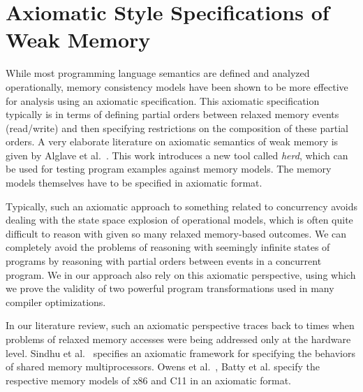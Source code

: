\section{Axiomatic Style Specifications of Weak Memory}

While most programming language semantics are defined and analyzed operationally, memory consistency models have been shown to be more effective for analysis using an axiomatic specification.
This axiomatic specification typically is in terms of defining partial orders between relaxed memory events (read/write) and then specifying restrictions on the composition of these partial orders. 
A very elaborate literature on axiomatic semantics of weak memory is given by Alglave et al.~\cite{Alglave}. 
This work introduces a new tool called \textit{herd}, which can be used for testing program examples against memory models. The memory models themselves have to be specified in axiomatic format. 

Typically, such an axiomatic approach to something related to concurrency avoids dealing with the state space explosion of operational models, which is often quite difficult to reason with given so many relaxed memory-based outcomes. 
We can completely avoid the problems of reasoning with seemingly infinite states of programs by reasoning with partial orders between events in a concurrent program.
We in our approach also rely on this axiomatic perspective, using which we prove the validity of two powerful program transformations used in many compiler optimizations. 

In our literature review, such an axiomatic perspective traces back to times when problems of relaxed memory accesses were being addressed only at the hardware level. 
Sindhu et al.~\cite{Sindhu} specifies an axiomatic framework for specifying the behaviors of shared memory multiprocessors. 
Owens et al.~\cite{OwensS}, Batty et al.\cite{BattyM} specify the respective memory models of x86 and C11 in an axiomatic format. 



